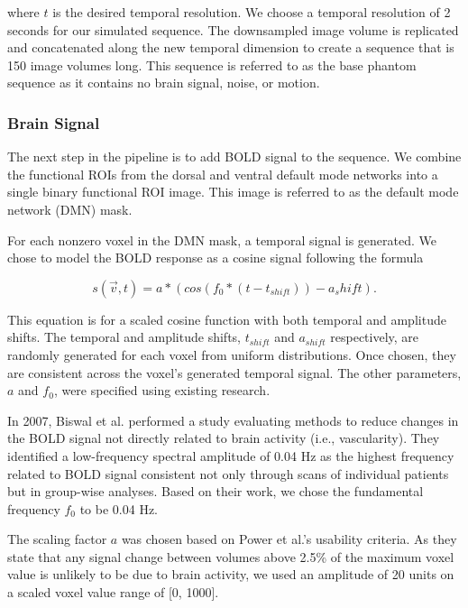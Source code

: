 \noindent where $t$ is the desired temporal resolution. We choose a temporal resolution of 2 seconds for our simulated sequence. The downsampled image volume is replicated and concatenated along the new temporal dimension to create a sequence that is 150 image volumes long. This sequence is referred to as the base phantom sequence as it contains no brain signal, noise, or motion.

\subsubsection{Brain Signal}

The next step in the pipeline is to add BOLD signal to the sequence. %
We combine the functional ROIs from the dorsal and ventral default mode networks into a single binary functional ROI image. This image is referred to as the default mode network (DMN) mask. 

For each nonzero voxel in the DMN mask, a temporal signal is generated. We chose to model the BOLD response as a cosine signal following the formula

\begin{equation}
s(\vec{v}, t) = a*(cos(f_0 * (t-t_{shift})) - a_shift).
\label{ch5:bold_eq}
\end{equation}

\noindent This equation is for a scaled cosine function with both temporal and amplitude shifts. The temporal and amplitude shifts, $t_{shift}$ and $a_{shift}$ respectively, are randomly generated for each voxel from uniform distributions. Once chosen, they are consistent across the voxel's generated temporal signal. The other parameters, $a$ and $f_0$, were specified using existing research. 

In 2007, Biswal et al. performed a study evaluating methods to reduce changes in the BOLD signal not directly related to brain activity (i.e., vascularity). They identified a low-frequency spectral amplitude of 0.04 Hz as the highest frequency related to BOLD signal consistent not only through scans of individual patients but in group-wise analyses. Based on their work, we chose the fundamental frequency $f_0$ to be 0.04 Hz. %

The scaling factor $a$ was chosen based on Power et al.'s usability criteria. As they state that any signal change between volumes above 2.5\% of the maximum voxel value is unlikely to be due to brain activity, we used an amplitude of 20 units on a scaled voxel value range of [0, 1000]. %

